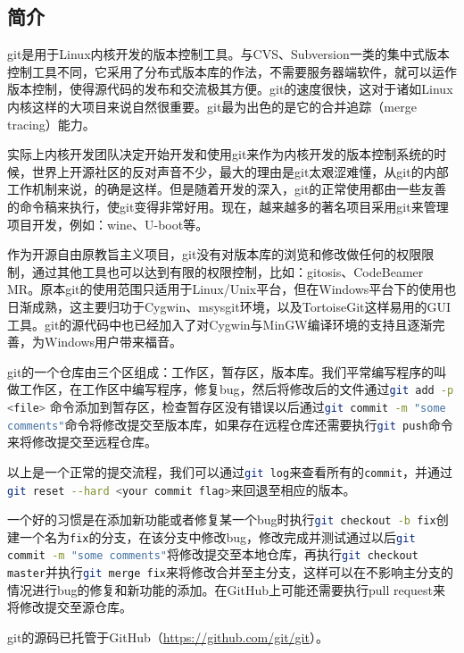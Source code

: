 		\subsection{简介}
			\par git是用于Linux内核开发的版本控制工具。与CVS、Subversion一类的集中式版本控制工具不同，它采用了分布式版本库的作法，不需要服务器端软件，就可以运作版本控制，使得源代码的发布和交流极其方便。git的速度很快，这对于诸如Linux内核这样的大项目来说自然很重要。git最为出色的是它的合并追踪（merge tracing）能力。
			\par 实际上内核开发团队决定开始开发和使用git来作为内核开发的版本控制系统的时候，世界上开源社区的反对声音不少，最大的理由是git太艰涩难懂，从git的内部工作机制来说，的确是这样。但是随着开发的深入，git的正常使用都由一些友善的命令稿来执行，使git变得非常好用。现在，越来越多的著名项目采用git来管理项目开发，例如：wine、U-boot等。
			\par 作为开源自由原教旨主义项目，git没有对版本库的浏览和修改做任何的权限限制，通过其他工具也可以达到有限的权限控制，比如：gitosis、CodeBeamer MR。原本git的使用范围只适用于Linux/Unix平台，但在Windows平台下的使用也日渐成熟，这主要归功于Cygwin、msysgit环境，以及TortoiseGit这样易用的GUI工具。git的源代码中也已经加入了对Cygwin与MinGW编译环境的支持且逐渐完善，为Windows用户带来福音。\cite{ wiki:Git}
			\par git的一个仓库由三个区组成：工作区，暂存区，版本库。我们平常编写程序的叫做工作区，在工作区中编写程序，修复bug，然后将修改后的文件通过\lstinline[language=sh]{git add -p <file>}	命令添加到暂存区，检查暂存区没有错误以后通过\lstinline[language=sh]{git commit -m "some comments"}命令将修改提交至版本库，如果存在远程仓库还需要执行\lstinline[language=sh]{git push}命令来将修改提交至远程仓库。
			\par 以上是一个正常的提交流程，我们可以通过\lstinline[language=sh]{git log}来查看所有的\lstinline[language=sh]{commit}，并通过\lstinline[language=sh]{git reset --hard <your commit flag>}来回退至相应的版本。
			\par 一个好的习惯是在添加新功能或者修复某一个bug时执行\lstinline[language=sh]{git checkout -b fix}创建一个名为\lstinline[language=sh]{fix}的分支，在该分支中修改bug，修改完成并测试通过以后\lstinline[language=sh]{git commit -m "some comments"}将修改提交至本地仓库，再执行\lstinline[language=sh]{git checkout master}并执行\lstinline[language=sh]{git merge fix}来将修改合并至主分支，这样可以在不影响主分支的情况进行bug的修复和新功能的添加。在GitHub上可能还需要执行pull request来将修改提交至源仓库。
			\par git的源码已托管于GitHub（\href{https://github.com/git/git}{https://github.com/git/git}）。
